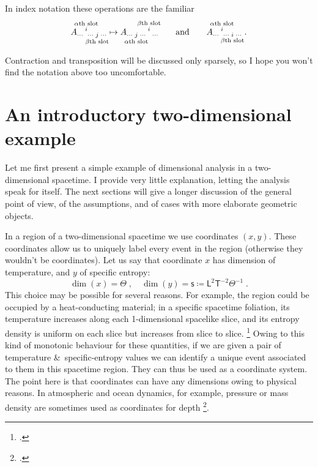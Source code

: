 \documentclass[a4paper,12pt,onecolumn,oneside,article,british]{memoir}
\newcommand*{\citep}{\footcites}
\newcommand*{\amp}{\&}
\newcommand*{\defd}{\coloneqq}
\newcommand*{\sect}{\S}%
\newcommand*{\chap}{ch.}%
\newcommand*{\eg}{{e.g.}}
\newcommand*{\Le}{\textsf{L}}
\newcommand*{\Ti}{\textsf{T}}
\newcommand*{\Te}{\Theta}
\newcommand*{\Ent}{\textsf{s}}
\renewcommand*{\i}{\indices}
\begin{document}
In index notation these operations are the familiar
\begin{equation*}
  A\i{_{\dotsm\;}^{%
      \overset{\mathclap{\scriptstyle\text{$\alpha$th slot}}}{i}
    }_{\dotsm\;%
      \underset{\mathclap{\scriptstyle\text{$\beta$th slot}}}{j}
      \;\dotsm}}
  \mapsto
  A\i{_{\dotsm\;%
      \underset{\mathclap{\scriptstyle\text{$\alpha$th slot}}}{j}
      \;\dotsm\;}^{%
      \overset{\mathclap{\scriptstyle\text{$\beta$th slot}}}{i}
    }_{\;\dotsm}} 
  \qquad\text{and}\qquad
  A\i{_{\dotsm\;}^{%
      \overset{\mathclap{\scriptstyle\text{$\alpha$th slot}}}{i}
    }_{\dotsm\;%
      \underset{\mathclap{\scriptstyle\text{$\beta$th slot}}}{i}
      \;\dotsm}} \;.
\end{equation*}

Contraction and transposition will be discussed only sparsely, so I hope
you won't find the notation above too uncomfortable.



\section{An introductory two-dimensional example}
\label{sec:2d_example}

Let me first present a simple example of dimensional analysis in a
two-dimensional spacetime. I provide very little explanation, letting the
analysis speak for itself. The next sections will give a longer discussion
of the general point of view, of the assumptions, and of cases with more
elaborate geometric objects.

In a region of a two-dimensional spacetime we use coordinates $(x,y)$.
These coordinates allow us to uniquely label every event in the region
(otherwise they wouldn't be coordinates). Let us say that coordinate $x$
has dimension of temperature, and $y$ of specific entropy:
\begin{equation}
  \label{eq:example_coords2d}
  \dim(x)=\Te \;,\quad
  \dim(y)= \Ent \defd \Le^{2}\Ti^{-2}\Te^{-1} \;.
\end{equation}
This choice may be possible for several reasons. For example, the region
could be occupied by a heat-conducting material; in a specific spacetime
foliation, its temperature increases along each 1-dimensional spacelike
slice, and its entropy density is uniform on each slice but increases from
slice to slice. \citep[For general-relativistic thermomechanics see
\eg][]{eckart1940c,maugin1974b,maugin1978b,maugin1978c,maugin1978d,maugin1978e,muschiketal2014}
Owing to this kind of monotonic behaviour for these quantities, if we are
given a pair of temperature \amp\ specific-entropy values we can identify a
unique event associated to them in this spacetime region. They can thus be
used as a coordinate system. The point here is that coordinates can have
any dimensions owing to physical reasons. In atmospheric and ocean
dynamics, for example, pressure or mass density are sometimes used as
coordinates for depth
\citep[\chap~6]{griffies2004}[\sect~2.6.2]{vallis2006}.
\end{document}
